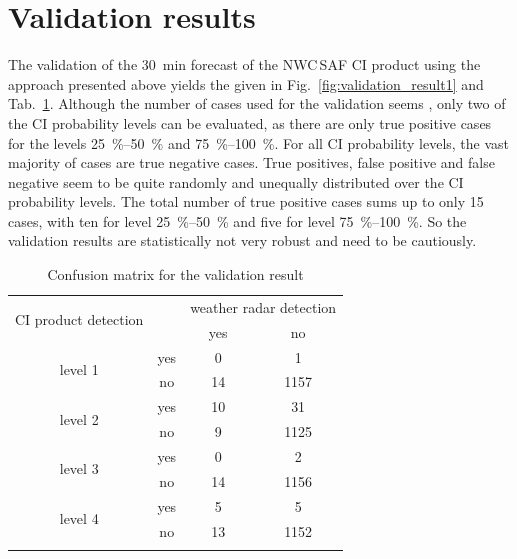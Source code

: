 \section{Validation results}
The validation of the \SI{30}{\minute} forecast of the NWC\,SAF CI product  using the approach presented above yields the  given in Fig.~\ref{fig:validation_result1} and Tab.~\ref{tab:validation_result}. Although the number of cases used for the validation seems , only two of the CI probability levels can be evaluated, as there are only true positive cases for the levels \SIrange{25}{50}{\percent} and \SIrange{75}{100}{\percent}. For all CI probability levels, the vast majority of cases are true negative cases. True positives, false positive and false negative seem to be quite randomly and unequally distributed over the CI probability levels. The total number of true positive cases sums up to only 15 cases, with ten for level \SIrange{25}{50}{\percent} and five for level \SIrange{75}{100}{\percent}. So the validation results are statistically not very robust and need to be  cautiously. 

\begin{table}[htb]
\centering
\caption{Confusion matrix for the validation result}
\begin{tabular}{cccc} 
\toprule
\multirow{2}{*}{CI product detection} &     & \multicolumn{2}{c}{weather radar detection} \\
							   						  \cmidrule{3-4}
									  &     &  yes & no \\
\midrule
\multirow{2}{*}{level 1}  & yes &    0 &    1 \\
	                                  & no  &   14 & 1157 \\ 
\midrule
\multirow{2}{*}{level 2}  & yes &   10 &   31 \\ 
	                                  & no  &    9 & 1125 \\ 
\midrule	                                  
\multirow{2}{*}{level 3}  & yes &    0 &    2 \\ 
	                                  & no  &   14 & 1156 \\ 
\midrule	                                  
\multirow{2}{*}{level 4}  & yes &    5 &    5 \\ 
	                                  & no  &   13 & 1152 \\
\addlinespace
\bottomrule
\end{tabular}
\label{tab:validation_result}
\end{table}

